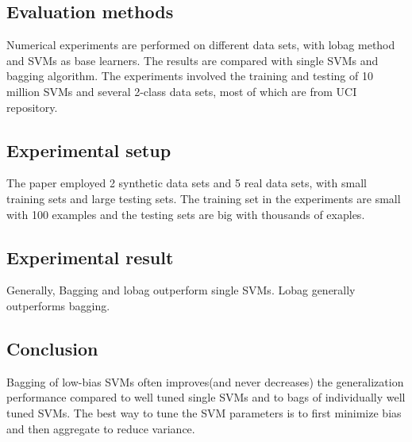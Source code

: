 \documentclass[12pt]{article}
\begin{document}
\subsection{Evaluation methods}
Numerical experiments are performed on different data sets, with lobag method and SVMs as base learners. The results are compared with single SVMs and bagging algorithm. The experiments involved the training and testing of 10 million SVMs and several 2-class data sets, most of which are from UCI repository.
\subsection{Experimental setup}
The paper employed 2 synthetic data sets and 5 real data sets, with small training sets and large testing sets. The training set in the experiments are small with 100 examples and the testing sets are big with thousands of exaples.
\subsection{Experimental result}
Generally, Bagging and lobag outperform single SVMs. Lobag generally outperforms bagging.
\subsection{Conclusion}
Bagging of low-bias SVMs often improves(and never decreases) the generalization performance compared to well tuned single SVMs and to bags of individually well tuned SVMs. The best way to tune the SVM parameters is to first minimize bias and then aggregate to reduce variance.

      
\end{document}
